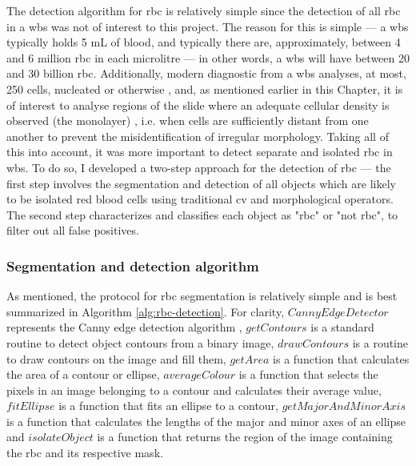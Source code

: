 The detection algorithm for \ac{rbc} is relatively simple since the detection of all \ac{rbc} in a \ac{wbs} was not of interest to this project. The reason for this is simple --- a \ac{wbs} typically holds 5 mL of blood, and typically there are, approximately, between 4 and 6 million \ac{rbc} in each microlitre \cite{Bain2004-uq} --- in other words, a \ac{wbs} will have between 20 and 30 billion \ac{rbc}. Additionally, modern diagnostic from a \ac{wbs} analyses, at most, 250 cells, nucleated or otherwise \cite{Bain2005-zg}, and, as mentioned earlier in this Chapter, it is of interest to analyse regions of the slide where an adequate cellular density is observed (the monolayer) \cite{Adewoyin2014-vo}, i.e. when cells are sufficiently distant from one another to prevent the misidentification of irregular morphology. Taking all of this into account, it was more important to detect separate and isolated \ac{rbc} in \ac{wbs}. To do so, I developed a two-step approach for the detection of \ac{rbc} --- the first step involves the segmentation and detection of all objects which are likely to be isolated red blood cells using traditional \ac{cv} and morphological operators. The second step characterizes and classifies each object as "\ac{rbc}" or "not \ac{rbc}", to filter out all false positives.

\subsubsection{Segmentation and detection algorithm}

As mentioned, the protocol for \ac{rbc} segmentation is relatively simple and is best summarized in Algorithm \ref{alg:rbc-detection}. For clarity, $CannyEdgeDetector$ represents the Canny edge detection algorithm \cite{Canny1986-pi}, $getContours$ is a standard routine to detect object contours from a binary image, $drawContours$ is a routine to draw contours on the image and fill them, $getArea$ is a function that calculates the area of a contour or ellipse, $averageColour$ is a function that selects the pixels in an image belonging to a contour and calculates their average value, $fitEllipse$ is a function that fits an ellipse to a contour, $getMajorAndMinorAxis$ is a function that calculates the lengths of the major and minor axes of an ellipse and $isolateObject$ is a function that returns the region of the image containing the \ac{rbc} and its respective mask. 


